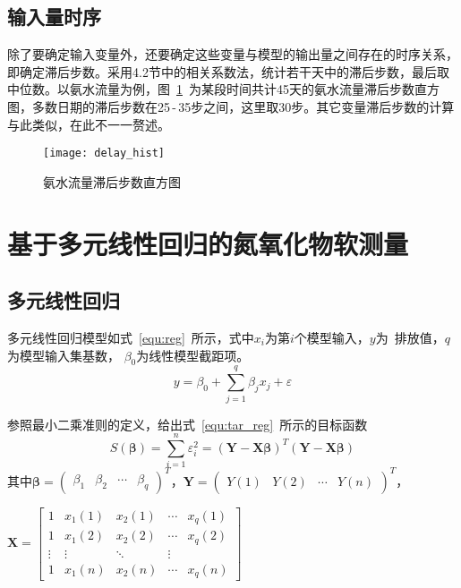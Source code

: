 \subsection{输入量时序}

除了要确定输入变量外，还要确定这些变量与模型的输出量之间存在的时序关系，即确定滞后步数。采用4.2节中的相关系数法，统计若干天中的滞后步数，最后取中位数。以氨水流量为例，图~\ref{fig:delay_hist}~为某段时间共计45天的氨水流量滞后步数直方图，多数日期的滞后步数在25$\,$-$\,$35步之间，这里取30步。其它变量滞后步数的计算与此类似，在此不一一赘述。
\begin{figure}[!hbt]
\centering
\texttt{[image: delay\_hist]}
\caption{氨水流量滞后步数直方图} \label{fig:delay_hist}
\end{figure}
\section{基于多元线性回归的氮氧化物软测量}
\subsection{多元线性回归}
多元线性回归模型如式~\ref{equ:reg}~所示，式中$x_{i}$为第$i$个模型输入，$y$为~排放值，$q$为模型输入集基数， $\beta_{0}$为线性模型截距项。
\begin{equation}
\label{equ:reg}
y= \beta_{0}+\sum_{j=1}^{q}{\beta_{j}}{x_{j}}+\varepsilon
\end{equation} 

参照最小二乘准则的定义，给出式~\ref{equ:tar_reg}~所示的目标函数
\begin{equation}
\label{equ:tar_reg}
{S}(\bm{\beta})=\sum_{i=1}^{n}{\varepsilon_{i}^{2}}=(\bm{Y}-\bm{X}\bm{\beta})^{T}(\bm{Y}-\bm{X}\bm{\beta})
\end{equation}
其中$\bm{\beta} = {\begin{pmatrix} \beta_{1} & \beta_{2} &\cdots & \beta_{q} \end{pmatrix}}^{T}$，$\bm{Y} = {\begin{pmatrix} Y(1) & Y(2) &\cdots & Y(n) \end{pmatrix}}^{T}$，

\noindent
$\bm{X} = \left[{\begin{array}{ccccc}
1&x_{1}{(1)}  & x_{2}{(1)}&\cdots&x_{q}{(1)}\\
1&x_{1}{(2)}  & x_{2}{(2)}&\cdots&x_{q}{(2)}\\
\vdots & \vdots &\ddots  &\vdots\\
1&x_{1}{(n)}  & x_{2}{(n)}&\cdots&x_{q}{(n)}
\end{array}}\right]$
   
